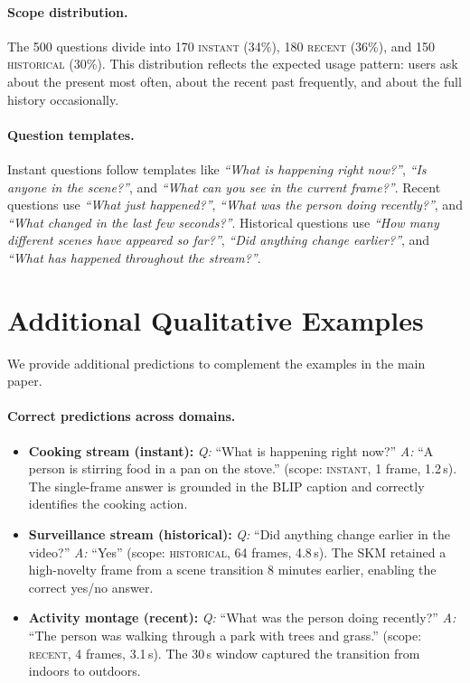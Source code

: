 \paragraph{Scope distribution.}
The 500 questions divide into 170 \textsc{instant} (34\%), 180 \textsc{recent} (36\%), and 150 \textsc{historical} (30\%).
This distribution reflects the expected usage pattern: users ask about the present most often, about the recent past frequently, and about the full history occasionally.

\paragraph{Question templates.}
Instant questions follow templates like \emph{``What is happening right now?''}, \emph{``Is anyone in the scene?''}, and \emph{``What can you see in the current frame?''}.
Recent questions use \emph{``What just happened?''}, \emph{``What was the person doing recently?''}, and \emph{``What changed in the last few seconds?''}.
Historical questions use \emph{``How many different scenes have appeared so far?''}, \emph{``Did anything change earlier?''}, and \emph{``What has happened throughout the stream?''}.

\section{Additional Qualitative Examples}
\label{sec:suppl_qual}

We provide additional predictions to complement the examples in the main paper.

\paragraph{Correct predictions across domains.}
\begin{itemize}[itemsep=4pt,leftmargin=*]
  \item \textbf{Cooking stream (instant):} \emph{Q:} ``What is happening right now?'' \emph{A:} ``A person is stirring food in a pan on the stove.'' (scope: \textsc{instant}, 1 frame, 1.2\,s). The single-frame answer is grounded in the BLIP caption and correctly identifies the cooking action.

  \item \textbf{Surveillance stream (historical):} \emph{Q:} ``Did anything change earlier in the video?'' \emph{A:} ``Yes'' (scope: \textsc{historical}, 64 frames, 4.8\,s). The SKM retained a high-novelty frame from a scene transition 8 minutes earlier, enabling the correct yes/no answer.

  \item \textbf{Activity montage (recent):} \emph{Q:} ``What was the person doing recently?'' \emph{A:} ``The person was walking through a park with trees and grass.'' (scope: \textsc{recent}, 4 frames, 3.1\,s). The 30\,s window captured the transition from indoors to outdoors.
\end{itemize}

